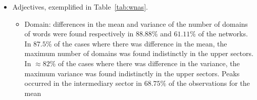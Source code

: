 \begin{itemize}
\begin{itemize}
																																																																																																																																																																			\FloatBarrier
																																																																																																																																																																					\end{itemize}
																																																																																																																																																																						\item Adjectives, exemplified in Table~\ref{tab:wnas}.
																																																																																																																																																																								\begin{itemize}
																																																																																																																																																																											\item Domain:
																																																																																																																																																																															differences in the mean and variance of the number of domains of words were found respectively in $88.88\%$ and $61.11\%$ of the networks.
																																																																																																																																																																																			In $87.5\%$ of the cases where there was difference in the mean, 
																																																																																																																																																																																							the maximum number of domains was found indistinctly in the upper sectors.
																																																																																																																																																																																											In $\approx 82\%$ of the cases where there was difference in the variance, 
																																																																																																																																																																																															the maximum variance was found indistinctly in the upper sectors.
																																																																																																																																																																																																			Peaks occurred in the intermediary sector in $68.75\%$ of the observations for the mean

\end{itemize}
\end{itemize}
